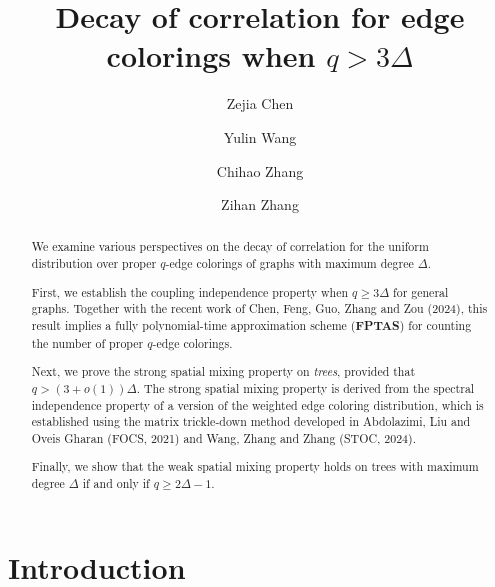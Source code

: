 \documentclass[a4paper,11pt]{article}
\title{Decay of correlation for edge colorings when $q>3\Delta$}
\author[1]{Zejia Chen}
\author[1]{Yulin Wang}
\author[1]{Chihao Zhang}
\author[2]{Zihan Zhang}
\affil[1]{Shanghai Jiao Tong University}
\affil[2]{Graduate Institute for Advanced Studies, SOKENDAI}
\begin{document}
\maketitle

\begin{abstract}
    We examine various perspectives on the decay of correlation for the uniform distribution over proper $q$-edge colorings of graphs with maximum degree $\Delta$.

    First, we establish the coupling independence property when $q\ge 3\Delta$ for general graphs. Together with the recent work of Chen, Feng, Guo, Zhang and Zou (2024), this result implies a fully polynomial-time approximation scheme (\textbf{FPTAS}) for counting the number of proper $q$-edge colorings. 

    Next, we prove the strong spatial mixing property on \emph{trees}, provided that $q> (3+o(1))\Delta$. The strong spatial mixing property is derived from the spectral independence property of a version of the weighted edge coloring distribution, which is established using the matrix trickle-down method developed in Abdolazimi, Liu and Oveis Gharan (FOCS, 2021) and Wang, Zhang and Zhang (STOC, 2024).

    Finally, we show that the weak spatial mixing property holds on trees with maximum degree $\Delta$ if and only if $q\ge 2\Delta-1$.
\end{abstract}

\setcounter{tocdepth}{1}
\tableofcontents
\newpage


\section{Introduction}
\end{document}
